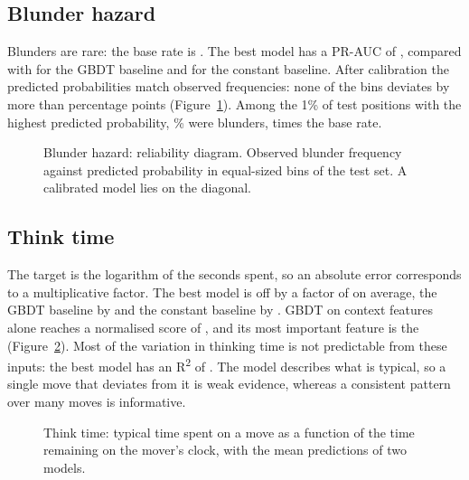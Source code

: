 \documentclass[11pt]{article}
\begin{document}
\subsection{Blunder hazard}

Blunders are rare: the base rate is . The
best model has a PR-AUC of , compared with
 for the GBDT baseline and
 for the constant baseline. After calibration
the predicted probabilities match observed frequencies: none of the
 bins deviates by more than
 percentage points
(Figure~\ref{fig:blunder}). Among the 1\% of test positions with the highest
predicted probability, \% were blunders,
 times the base rate.

\begin{figure}[htbp]\centering
{}
\caption{Blunder hazard: reliability diagram. Observed blunder frequency
against predicted probability in 
equal-sized bins of the test set. A calibrated model lies on the diagonal.}
\label{fig:blunder}
\end{figure}

\subsection{Think time}

The target is the logarithm of the seconds spent, so an absolute error
corresponds to a multiplicative factor. The best model is off by a factor of
 on average, the GBDT baseline by
 and the constant baseline by
. GBDT on context features alone reaches a
normalised score of , and its most
important feature is the 
(Figure~\ref{fig:think}). Most of the variation in thinking time is not
predictable from these inputs: the best model has an R\textsuperscript{2} of
. The model describes what is typical, so a single
move that deviates from it is weak evidence, whereas a consistent pattern
over many moves is informative.

\begin{figure}[htbp]\centering
{}
\caption{Think time: typical time spent on a move as a function of the time
remaining on the mover's clock, with the mean predictions of two
models.}
\label{fig:think}
\end{figure}
\end{document}
